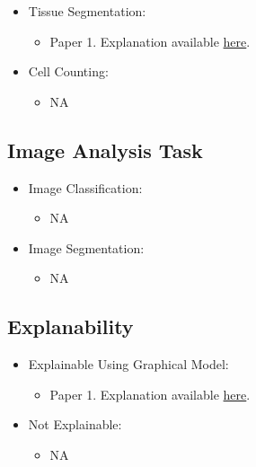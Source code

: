 \begin{itemize}

	\item \label{c_mt_1} Tissue Segmentation:
	\begin{itemize}
		\item Paper 1. Explanation available \hyperref[p1]{here}.
	\end{itemize}
	
	\item \label{c_mt_2} Cell Counting:
	\begin{itemize}
		\item NA
	\end{itemize}
	
\end{itemize}

\subsection{Image Analysis Task}

\begin{itemize}

	\item \label{c_ia_1} Image Classification:
	\begin{itemize}
		\item NA
	\end{itemize}
	
	\item \label{c_ia_2} Image Segmentation:
	\begin{itemize}
		\item NA
	\end{itemize}
	
\end{itemize}

\subsection{Explanability}

\begin{itemize}

	\item \label{c_ex_1} Explainable Using Graphical Model:
	\begin{itemize}
		\item Paper 1. Explanation available \hyperref[p1]{here}.
	\end{itemize}
	
	\item \label{c_ex_2} Not Explainable:
	\begin{itemize}
		\item NA
	\end{itemize}
	
\end{itemize}

